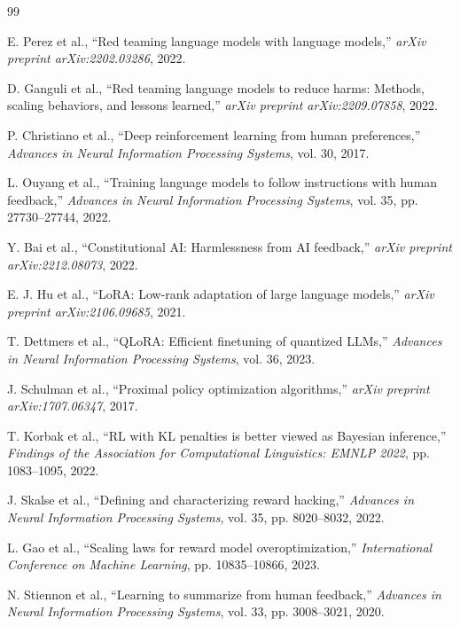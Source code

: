 \documentclass[conference]{IEEEtran}
\begin{document}
\begin{thebibliography}{99}

E. Perez et al., ``Red teaming language models with language models,'' \textit{arXiv preprint arXiv:2202.03286}, 2022.

D. Ganguli et al., ``Red teaming language models to reduce harms: Methods, scaling behaviors, and lessons learned,'' \textit{arXiv preprint arXiv:2209.07858}, 2022.

P. Christiano et al., ``Deep reinforcement learning from human preferences,'' \textit{Advances in Neural Information Processing Systems}, vol. 30, 2017.

L. Ouyang et al., ``Training language models to follow instructions with human feedback,'' \textit{Advances in Neural Information Processing Systems}, vol. 35, pp. 27730--27744, 2022.

Y. Bai et al., ``Constitutional AI: Harmlessness from AI feedback,'' \textit{arXiv preprint arXiv:2212.08073}, 2022.

E. J. Hu et al., ``LoRA: Low-rank adaptation of large language models,'' \textit{arXiv preprint arXiv:2106.09685}, 2021.

T. Dettmers et al., ``QLoRA: Efficient finetuning of quantized LLMs,'' \textit{Advances in Neural Information Processing Systems}, vol. 36, 2023.

J. Schulman et al., ``Proximal policy optimization algorithms,'' \textit{arXiv preprint arXiv:1707.06347}, 2017.

T. Korbak et al., ``RL with KL penalties is better viewed as Bayesian inference,'' \textit{Findings of the Association for Computational Linguistics: EMNLP 2022}, pp. 1083--1095, 2022.

J. Skalse et al., ``Defining and characterizing reward hacking,'' \textit{Advances in Neural Information Processing Systems}, vol. 35, pp. 8020--8032, 2022.

L. Gao et al., ``Scaling laws for reward model overoptimization,'' \textit{International Conference on Machine Learning}, pp. 10835--10866, 2023.

N. Stiennon et al., ``Learning to summarize from human feedback,'' \textit{Advances in Neural Information Processing Systems}, vol. 33, pp. 3008--3021, 2020.


\end{thebibliography}
\end{document}
